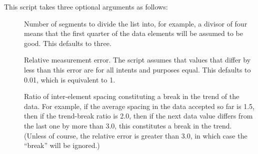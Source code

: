 This script takes three optional arguments as follows:

\begin{description}
\item	[\nf{:}] Number of segments to divide the list
	into, for example, a divisor of four means that the first quarter of
	the data elements will be assumed to be good.
	This defaults to three.
\item	[\nf{:}] Relative measurement error.
	The script assumes that values that differ by less than this
	error are for all intents and purposes equal.
	This defaults to 0.01, which is equivalent to 1\pct.
\item	[\nf{:}] Ratio of inter-element spacing
	constituting a break in the trend of the data.
	For example, if the average spacing in the data accepted so far
	is 1.5, then if the trend-break ratio is 2.0, then if the next
	data value differs from the last one by more than 3.0, this
	constitutes a break in the trend.
	(Unless of course, the relative error is greater than 3.0, in
	which case the ``break'' will be ignored.)
\end{description}

